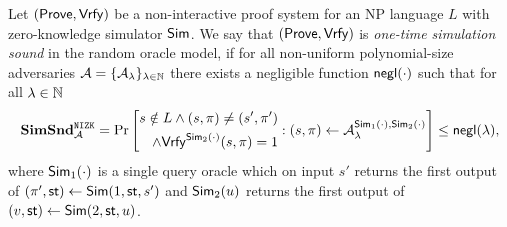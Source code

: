 \begin{definition}
Let $(\mathsf{Prove}, \mathsf{Vrfy})$ be a non-interactive proof system for an NP language $L$ with zero-knowledge simulator $\mathsf{Sim}$. We say that $(\mathsf{Prove}, \mathsf{Vrfy})$ is \emph{one-time simulation sound} in the random oracle model, if for all non-uniform polynomial-size adversaries $\mathcal{A} = \{\mathcal{A}_{\lambda}\}_{\lambda \in \mathbb{N}}$ there exists a negligible function $\mathsf{negl}(\cdot)$ such that for all $\lambda \in \mathbb{N}$ 
\[
\mathbf{SimSnd}_{\mathcal{A}}^{\mathtt{NIZK}} = \Pr\left[
\begin{aligned}
s \notin L \land (s, \pi) \neq (s', \pi') \\
\land \mathsf{Vrfy}^{\mathsf{Sim}_2(\cdot)}(s, \pi) = 1
\end{aligned}
:(s, \pi) \leftarrow \mathcal{A}_{\lambda}^{\mathsf{Sim}_1(\cdot), \mathsf{Sim}_2(\cdot)} \right] \leq \mathsf{negl}(\lambda),
\]
where $\mathsf{Sim}_1(\cdot)$ is a single query oracle which on input $s'$ returns the first output of $(\pi', \mathsf{st}) \leftarrow \mathsf{Sim}(1, \mathsf{st}, s')$ and $\mathsf{Sim}_2(u)$ returns the first output of $(v, \mathsf{st}) \leftarrow \mathsf{Sim}(2, \mathsf{st}, u)$.
\end{definition}

